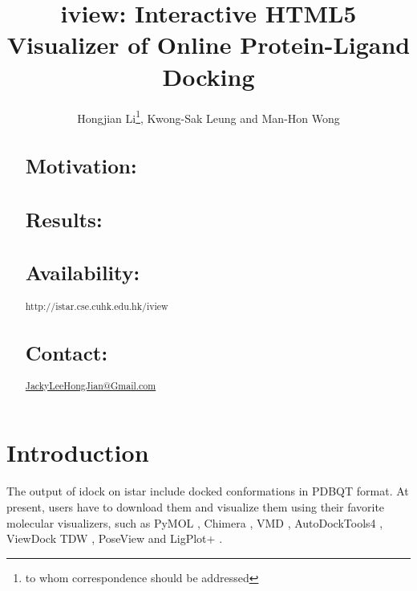 \documentclass{bioinfo}
\begin{document}

\title[iview]{iview: Interactive HTML5 Visualizer of Online Protein-Ligand Docking}
\author[Hongjian Li \textit{et~al}]{Hongjian Li\footnote{to whom correspondence should be addressed}, Kwong-Sak Leung and Man-Hon Wong}
\address{Department of Computer Science and Engineering, Chinese University of Hong Kong, Shatin, New Territories, Hong Kong, China}



\maketitle

\begin{abstract}

\section{Motivation:}

\section{Results:}

\section{Availability:}
http://istar.cse.cuhk.edu.hk/iview

\section{Contact:} \href{JackyLeeHongJian@Gmail.com}{JackyLeeHongJian@Gmail.com}
\end{abstract}

\section{Introduction}

The output of idock on istar include docked conformations in PDBQT format. At present, users have to download them and visualize them using their favorite molecular visualizers, such as PyMOL \citep{1221}, Chimera \citep{1219}, VMD \citep{1220}, AutoDockTools4 \citep{596}, ViewDock TDW \citep{559}, PoseView \citep{748} and LigPlot+ \citep{951}.
\end{document}
